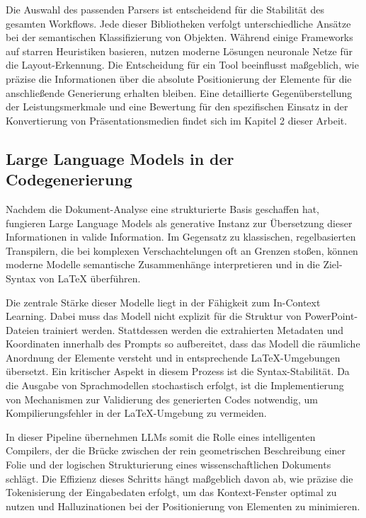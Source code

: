 \documentclass[a4paper]{article}
\begin{document}
Die Auswahl des passenden Parsers ist entscheidend für die Stabilität des gesamten Workflows. Jede dieser Bibliotheken verfolgt unterschiedliche Ansätze bei der semantischen Klassifizierung von Objekten. Während einige Frameworks auf starren Heuristiken basieren, nutzen moderne Lösungen neuronale Netze für die Layout-Erkennung. Die Entscheidung für ein Tool beeinflusst maßgeblich, wie präzise die Informationen über die absolute Positionierung der Elemente für die anschließende Generierung erhalten bleiben. Eine detaillierte Gegenüberstellung der Leistungsmerkmale und eine Bewertung für den spezifischen Einsatz in der Konvertierung von Präsentationsmedien findet sich im Kapitel 2 dieser Arbeit. \\



\subsection{Large Language Models in der Codegenerierung}

Nachdem die Dokument-Analyse eine strukturierte Basis geschaffen hat, fungieren Large Language Models als generative Instanz zur Übersetzung dieser Informationen in valide Information. Im Gegensatz zu klassischen, regelbasierten Transpilern, die bei komplexen Verschachtelungen oft an Grenzen stoßen, können moderne Modelle semantische Zusammenhänge interpretieren und in die Ziel-Syntax von LaTeX überführen.


Die zentrale Stärke dieser Modelle liegt in der Fähigkeit zum In-Context Learning. Dabei muss das Modell nicht explizit für die Struktur von PowerPoint-Dateien trainiert werden. Stattdessen werden die extrahierten Metadaten und Koordinaten innerhalb des Prompts so aufbereitet, dass das Modell die räumliche Anordnung der Elemente versteht und in entsprechende LaTeX-Umgebungen übersetzt. Ein kritischer Aspekt in diesem Prozess ist die Syntax-Stabilität. Da die Ausgabe von Sprachmodellen stochastisch erfolgt, ist die Implementierung von Mechanismen zur Validierung des generierten Codes notwendig, um Kompilierungsfehler in der LaTeX-Umgebung zu vermeiden.

In dieser Pipeline übernehmen LLMs somit die Rolle eines intelligenten Compilers, der die Brücke zwischen der rein geometrischen Beschreibung einer Folie und der logischen Strukturierung eines wissenschaftlichen Dokuments schlägt. Die Effizienz dieses Schritts hängt maßgeblich davon ab, wie präzise die Tokenisierung der Eingabedaten erfolgt, um das Kontext-Fenster optimal zu nutzen und Halluzinationen bei der Positionierung von Elementen zu minimieren.
\end{document}
